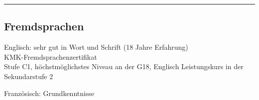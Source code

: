 \documentclass[10pt,letterpaper]{article}
\newenvironment{indentsection}[1]%
{\begin{list}{}%
	{\setlength{\leftmargin}{#1}}%
	\item[]%
}
{\end{list}}
\begin{document}
\hrule
\vspace{-0.4em}
\subsection*{Fremdsprachen}

\begin{indentsection}{\parindent}
	\begin{description*}
		\item[Englisch:] sehr gut in Wort und Schrift (18 Jahre Erfahrung) \\ KMK-Fremdsprachenzertifikat \\ Stufe C1, höchstmöglichstes Niveau an der G18, 	Englisch Leistungskurs in der Sekundarstufe 2
		\item[Französisch:] Grundkenntnisse
	\end{description*}
\end{indentsection}
\end{document}
